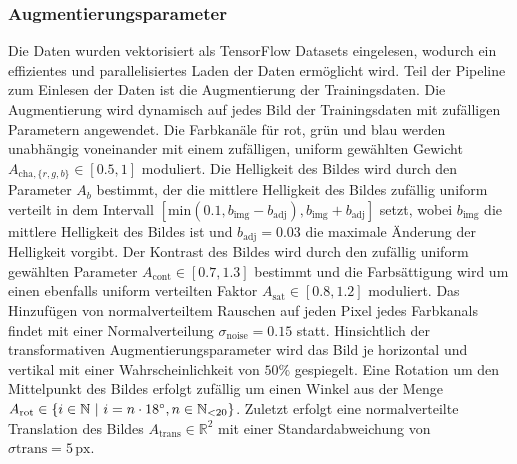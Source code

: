 \subsubsection{Augmentierungsparameter}

Die Daten wurden vektorisiert als TensorFlow Datasets eingelesen, wodurch ein effizientes und parallelisiertes Laden der Daten ermöglicht wird. Teil der Pipeline zum Einlesen der Daten ist die Augmentierung der Trainingsdaten. Die Augmentierung wird dynamisch auf jedes Bild der Trainingsdaten mit zufälligen Parametern angewendet. Die Farbkanäle für rot, grün und blau werden unabhängig voneinander mit einem zufälligen, uniform gewählten Gewicht $A_{\text{cha}, \{r,g,b\}} \in [0.5, 1]$ moduliert. Die Helligkeit des Bildes wird durch den Parameter $A_b$ bestimmt, der die mittlere Helligkeit des Bildes zufällig uniform verteilt in dem Intervall $[\text{min}(0.1, b_\text{img}-b_\text{adj}), b_\text{img} + b_\text{adj}]$ setzt, wobei $b_\text{img}$ die mittlere Helligkeit des Bildes ist und $b_\text{adj} = 0.03$ die maximale Änderung der Helligkeit vorgibt. Der Kontrast des Bildes wird durch den zufällig uniform gewählten Parameter $A_\text{cont} \in [0.7, 1.3]$ bestimmt und die Farbsättigung wird um einen ebenfalls uniform verteilten Faktor $A_\text{sat} \in [0.8, 1.2]$ moduliert. Das Hinzufügen von normalverteiltem Rauschen auf jeden Pixel jedes Farbkanals findet mit einer Normalverteilung $\sigma_\text{noise} = 0.15$ statt. Hinsichtlich der transformativen Augmentierungsparameter wird das Bild je horizontal und vertikal mit einer Wahrscheinlichkeit von $50\%$ gespiegelt. Eine Rotation um den Mittelpunkt des Bildes erfolgt zufällig um einen Winkel aus der Menge $A_\text{rot} \in \{i \in \mathbb{N} ~\vert~ i = n \cdot 18^{\circ}, n \in \mathbb{N}_{<20}\}$. Zuletzt erfolgt eine normalverteilte Translation des Bildes $A_\text{trans} \in \mathbb{R}^2$ mit einer Standardabweichung von $\sigma\text{trans} = 5\,\text{px}$.

